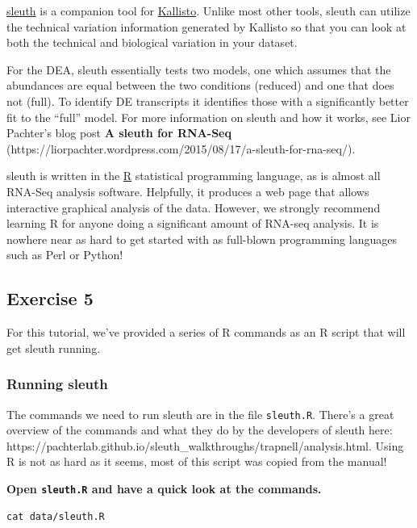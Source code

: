 \documentclass[11pt]{article}
\makeatletter
\newcommand{\boxspacing}{\kern\kvtcb@left@rule\kern\kvtcb@boxsep}
\newcommand{\prompt}[4]{
        \ttfamily\llap{{\color{#2}[#3]:\hspace{3pt}#4}}\vspace{-\baselineskip}
    }
\makeatother
\begin{document}
\href{https://pachterlab.github.io/sleuth}{sleuth} is a companion tool
for \href{https://pachterlab.github.io/kallisto}{Kallisto}. Unlike most
other tools, sleuth can utilize the technical variation information
generated by Kallisto so that you can look at both the technical and
biological variation in your dataset.

For the DEA, sleuth essentially tests two models, one which assumes that
the abundances are equal between the two conditions (reduced) and one
that does not (full). To identify DE transcripts it identifies those
with a significantly better fit to the ``full'' model. For more
information on sleuth and how it works, see Lior Pachter's blog post
\textbf{A sleuth for RNA-Seq}
(https://liorpachter.wordpress.com/2015/08/17/a-sleuth-for-rna-seq/).

sleuth is written in the \href{https://www.r-project.org/}{R}
statistical programming language, as is almost all RNA-Seq analysis
software. Helpfully, it produces a web page that allows interactive
graphical analysis of the data. However, we strongly recommend learning
R for anyone doing a significant amount of RNA-seq analysis. It is
nowhere near as hard to get started with as full-blown programming
languages such as Perl or Python!

\newpage

    \hypertarget{exercise-5}{%
\subsection{Exercise 5}\label{exercise-5}}

    For this tutorial, we've provided a series of R commands as an R script
that will get sleuth running.

    \hypertarget{running-sleuth}{%
\subsubsection{Running sleuth}\label{running-sleuth}}

The commands we need to run sleuth are in the file \texttt{sleuth.R}.
There's a great overview of the commands and what they do by the
developers of sleuth here:
https://pachterlab.github.io/sleuth\_walkthroughs/trapnell/analysis.html.
Using R is not as hard as it seems, most of this script was copied from
the manual!

\textbf{Open \texttt{sleuth.R} and have a quick look at the commands.}

    \begin{tcolorbox}[breakable, size=fbox, boxrule=1pt, pad at break*=1mm,colback=cellbackground, colframe=cellborder]
\prompt{In}{incolor}{ }{\boxspacing}
\begin{Verbatim}[commandchars=\\\{\}]
cat data/sleuth.R
\end{Verbatim}
\end{tcolorbox}
\end{document}
